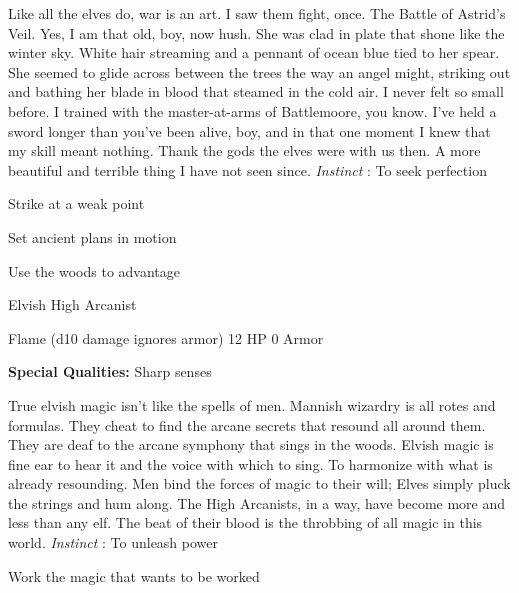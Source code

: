 \startMonsterDescription
Like all the elves do, war is an art. I saw them fight, once. The Battle of Astrid’s Veil. Yes, I am that old, boy, now hush. She was clad in plate that shone like the winter sky. White hair streaming and a pennant of ocean blue tied to her spear. She seemed to glide across between the trees the way an angel might, striking out and bathing her blade in blood that steamed in the cold air. I never felt so small before. I trained with the master-at-arms of Battlemoore, you know. I’ve held a sword longer than you’ve been alive, boy, and in that one moment I knew that my skill meant nothing. Thank the gods the elves were with us then. A more beautiful and terrible thing I have not seen since. {\em Instinct} : To seek perfection
\stopMonsterDescription
 
\startitemize[1,packed]

\item Strike at a weak point

 
\item Set ancient plans in motion

 
\item Use the woods to advantage


\stopitemize
 
\startMonsterName
Elvish High Arcanist	 
\stopMonsterName
 

Flame (d10 damage ignores armor)	12 HP	0 Armor

 


 
\startMonsterQualities
{\bf Special Qualities:}  Sharp senses
\stopMonsterQualities
 
\startMonsterDescription
True elvish magic isn’t like the spells of men. Mannish wizardry is all rotes and formulas. They cheat to find the arcane secrets that resound all around them. They are deaf to the arcane symphony that sings in the woods. Elvish magic is fine ear to hear it and the voice with which to sing. To harmonize with what is already resounding. Men bind the forces of magic to their will; Elves simply pluck the strings and hum along. The High Arcanists, in a way, have become more and less than any elf. The beat of their blood is the throbbing of all magic in this world. {\em Instinct} : To unleash power
\stopMonsterDescription
 
\startitemize[1,packed]

\item Work the magic that wants to be worked

